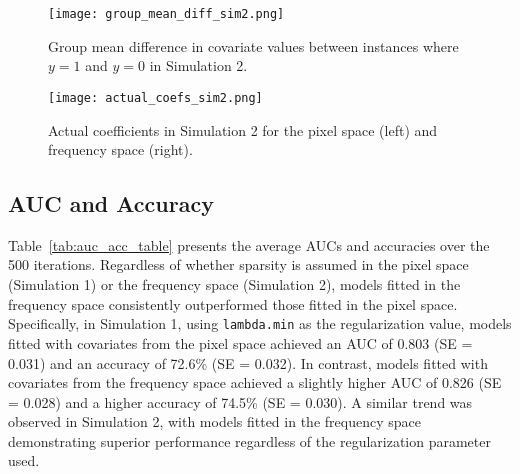 \documentclass[12pt]{article}
\begin{document}
\begin{figure}[h!]
	\centering
	\texttt{[image: group\_mean\_diff\_sim2.png]}
	\caption{Group mean difference in covariate values between instances where \( y = 1 \) and \( y = 0 \) in Simulation 2.}
	\label{fig:group_diff2}
\end{figure}

\begin{figure}[h!]
	\centering
	\texttt{[image: actual\_coefs\_sim2.png]}
	\caption{Actual coefficients in Simulation 2 for the pixel space (left) and frequency space (right).}
	\label{fig:coefs_sim2}
\end{figure}

\FloatBarrier

\subsection*{AUC and Accuracy}

Table~\ref*{tab:auc_acc_table} presents the average AUCs and accuracies over the 500 iterations. Regardless of whether
sparsity is assumed in the pixel space (Simulation 1) or the frequency space (Simulation 2), models fitted in the
frequency space consistently outperformed those fitted in the pixel space. Specifically, in Simulation 1, using
\texttt{lambda.min} as the regularization value, models fitted with covariates from the pixel space achieved an AUC of
0.803 (SE = 0.031) and an accuracy of 72.6\% (SE = 0.032). In contrast, models fitted with covariates from the
frequency space achieved a slightly higher AUC of 0.826 (SE = 0.028) and a higher accuracy of
74.5\% (SE = 0.030). A similar trend was observed in Simulation 2, with models fitted in the frequency space
demonstrating superior performance regardless of the regularization parameter used.
\end{document}
